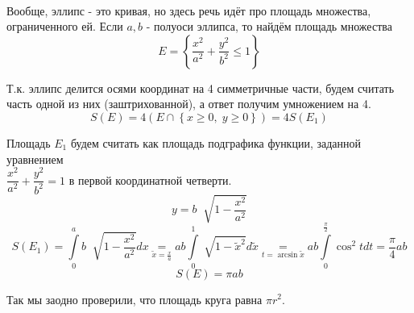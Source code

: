 \documentclass[../main.tex]{subfiles}
\begin{document}
\newpage
\begin{example}

    ~

    Вообще, эллипс - это кривая, но здесь речь идёт про площадь множества, ограниченного ей. Если \( a, b\) - полуоси эллипса, то найдём площадь множества 
    \[ E = \left\{ \dfrac{ x^2}{ a^2}+ \dfrac{ y^2}{ b^2} \leq 1\right\}\]

    Т.к. эллипс делится осями координат на 4 симметричные части, будем считать часть одной из них (заштрихованной), а ответ получим умножением на 4. 
    \[ S\left( E\right)=4\left( E \cap \left\{ x \geq 0, \;y \geq 0\right\}\right) = 4S(E_1)\]

    Площадь \(E_1\) будем считать как площадь подграфика функции, заданной уравнением \\
    \( \dfrac{ x^2}{ a^2}+ \dfrac{ y^2}{ b^2}=1\) в первой координатной четверти. 
    \[ y= b\;\sqrt[]{1- \dfrac{ x^2}{ a^2}}\]
    \[ S\left( E_1\right)= \displaystyle\int\limits_{ 0}^{ a} b \;\sqrt[]{1- \dfrac{ x^2}{ a^2}}dx \underset{\tilde{x}= \frac{ x}{ a}}{=} ab\displaystyle\int\limits_{ 0}^{ 1} \sqrt[]{1- \tilde{x}^2}d \tilde{x} \underset{ 
        t=\arcsin{ \tilde{x}}}{=} ab\displaystyle\int\limits_{ 0}^{ \frac{ \pi}{ 2}} \cos^2tdt= \dfrac{ \pi}{ 4}ab\]
    \[ \boxed{S\left( E\right)= \pi ab}\]

    Так мы заодно проверили, что площадь круга равна \( \pi r^2\).
\end{example}
\end{document}
